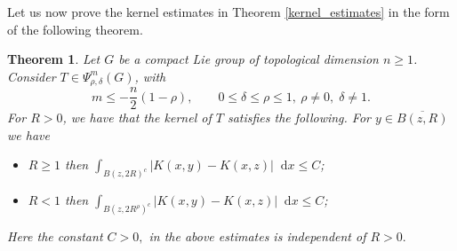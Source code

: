 \documentclass[12pt, reqno]{amsart}
\newtheorem{theorem}{Theorem}[section]
\theoremstyle{definition}
\theoremstyle{remark}
\numberwithin{equation}{section}
\newcommand*\diff{\mathop{}\!\mathrm{d}}
\begin{document}
Let us now prove the kernel estimates in Theorem \ref{kernel_estimates} in the form of the following theorem.
\begingroup
\renewcommand{\thetheorem}{1.1} %
\setcounter{theorem}{1}  
\begin{theorem}\label{kernel:lemma}
    Let $G$ be a compact Lie group of topological dimension $n\geq 1$. Consider $T\in\Psi^{m}_{\rho,\delta}(G)$, with
    \[
m \le -\frac{n}{2}(1-\rho),
\qquad 0 \le \delta \le \rho \le 1,\ \rho\neq0,\;\delta \neq 1.
\]
    For $R>0$, we have that the kernel of $T$ satisfies the following. For $y\in\overline{B(z, R)}$ we have
    \begin{itemize}
        \item $R\geq 1$ then
        $\int_{B(z, 2R)^c}|K(x,y)-K(x,z)|\diff{x}\leq C$;
         \item $R<1$ then $\int_{B(z, 2R^{\rho})^c}|K(x,y)-K(x,z)|\diff{x}\leq C$;
    \end{itemize} Here the constant $C>0,$ in the above estimates is independent of $R>0.$
\end{theorem}
\endgroup
\end{document}
